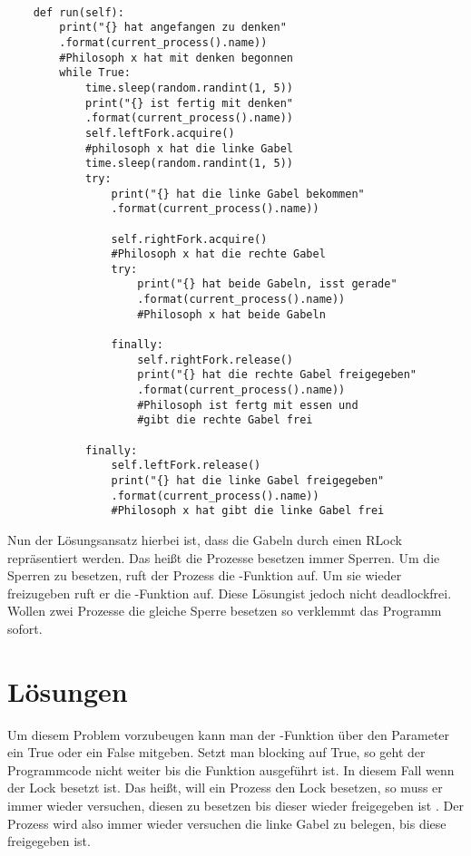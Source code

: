 \begin{lstlisting}[style = Python, caption = {erste Lösung}]

    def run(self):
        print("{} hat angefangen zu denken"
        .format(current_process().name)) 
        #Philosoph x hat mit denken begonnen
        while True:
            time.sleep(random.randint(1, 5))
            print("{} ist fertig mit denken"
            .format(current_process().name))
            self.leftFork.acquire() 
            #philosoph x hat die linke Gabel
            time.sleep(random.randint(1, 5))
            try:
                print("{} hat die linke Gabel bekommen"
                .format(current_process().name))

                self.rightFork.acquire() 
                #Philosoph x hat die rechte Gabel
                try:
                    print("{} hat beide Gabeln, isst gerade"
                    .format(current_process().name)) 
                    #Philosoph x hat beide Gabeln

                finally:
                    self.rightFork.release()
                    print("{} hat die rechte Gabel freigegeben"
                    .format(current_process().name)) 
                    #Philosoph ist fertg mit essen und 
                    #gibt die rechte Gabel frei

            finally:
                self.leftFork.release()
                print("{} hat die linke Gabel freigegeben"
                .format(current_process().name)) 
                #Philosoph x hat gibt die linke Gabel frei

\end{lstlisting}

Nun der Lösungsansatz hierbei ist, dass die Gabeln durch einen RLock repräsentiert werden. Das heißt die Prozesse besetzen immer Sperren. Um die Sperren zu besetzen, ruft der Prozess die -Funktion auf. Um sie wieder freizugeben ruft er die -Funktion auf. Diese \glqq Lösung\grqq ist jedoch nicht deadlockfrei. Wollen zwei Prozesse die gleiche Sperre besetzen so verklemmt das Programm sofort. 

\section{Lösungen}
\label{endloesung}

Um diesem Problem vorzubeugen kann man der -Funktion über den Parameter  ein True oder ein False mitgeben. Setzt man blocking auf True, so geht der Programmcode nicht weiter bis die Funktion ausgeführt ist. In diesem Fall wenn der Lock besetzt ist. Das heißt, will ein Prozess den Lock besetzen, so muss er immer wieder versuchen, diesen zu besetzen bis dieser wieder freigegeben ist \parencite[vgl. ]{lock}. Der Prozess wird also immer wieder versuchen die linke Gabel zu belegen, bis diese freigegeben ist. 

